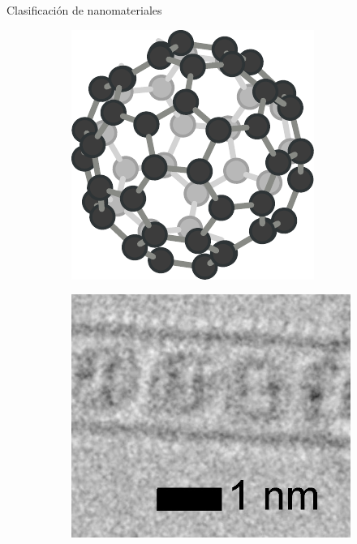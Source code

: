 \documentclass[aspectratio=169]{beamer}
\begin{document}
\begin{frame}{Clasificación de nanomateriales}
\begin{figure}
\begin{subfigure}[b]{0.15\textwidth}
				\includegraphics[width=\textwidth]{fullerene_structure.pdf}
				\caption{}
				\label{fig:fullerene_structure}
			\end{subfigure}
			\begin{subfigure}[b]{0.15\textwidth}
				\includegraphics[width=\textwidth]{fullerene_image.jpg}

\end{subfigure}
\end{figure}
\end{frame}
\end{document}
